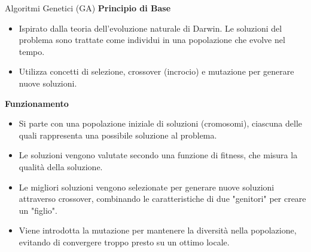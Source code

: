 \documentclass{beamer}
\begin{document}
\begin{frame}{Algoritmi Genetici (GA)}
    \textbf{Principio di Base}
    \begin{itemize}
        \item Ispirato dalla teoria dell'evoluzione naturale di Darwin. Le soluzioni del problema sono trattate come individui in una popolazione che evolve nel tempo.
        \item Utilizza concetti di selezione, crossover (incrocio) e mutazione per generare nuove soluzioni.
    \end{itemize}

    \textbf{Funzionamento}
    \begin{itemize}
        \item Si parte con una popolazione iniziale di soluzioni (cromosomi), ciascuna delle quali rappresenta una possibile soluzione al problema.
        \item Le soluzioni vengono valutate secondo una funzione di fitness, che misura la qualità della soluzione.
        \item Le migliori soluzioni vengono selezionate per generare nuove soluzioni attraverso crossover, combinando le caratteristiche di due "genitori" per creare un "figlio".
        \item Viene introdotta la mutazione per mantenere la diversità nella popolazione, evitando di convergere troppo presto su un ottimo locale.
    \end{itemize}
    \begin{table}[H]
        \centering


\end{table}
\end{frame}
\end{document}

